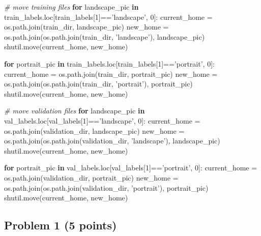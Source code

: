 \documentclass[11pt]{article}
\newenvironment{Shaded}{}{}
\newcommand{\KeywordTok}[1]{\textcolor[rgb]{0.00,0.44,0.13}{\textbf{{#1}}}}
\newcommand{\DecValTok}[1]{\textcolor[rgb]{0.25,0.63,0.44}{{#1}}}
\newcommand{\StringTok}[1]{\textcolor[rgb]{0.25,0.44,0.63}{{#1}}}
\newcommand{\CommentTok}[1]{\textcolor[rgb]{0.38,0.63,0.69}{\textit{{#1}}}}
\newcommand{\NormalTok}[1]{{#1}}
\newcommand{\ControlFlowTok}[1]{\textcolor[rgb]{0.00,0.44,0.13}{\textbf{{#1}}}}
\newcommand{\OperatorTok}[1]{\textcolor[rgb]{0.40,0.40,0.40}{{#1}}}
\begin{document}
    \begin{Shaded}
\begin{Highlighting}[]
\CommentTok{# move training files}
\ControlFlowTok{for}\NormalTok{ landscape_pic }\KeywordTok{in}\NormalTok{ train_labels.loc[train_labels[}\DecValTok{1}\NormalTok{]}\OperatorTok{==}\StringTok{'landscape'}\NormalTok{, }\DecValTok{0}\NormalTok{]:}
\NormalTok{    current_home }\OperatorTok{=}\NormalTok{ os.path.join(train_dir, landscape_pic)}
\NormalTok{    new_home }\OperatorTok{=}\NormalTok{ os.path.join(os.path.join(train_dir, }\StringTok{'landscape'}\NormalTok{), landscape_pic)}
\NormalTok{    shutil.move(current_home, new_home)}
    
\ControlFlowTok{for}\NormalTok{ portrait_pic }\KeywordTok{in}\NormalTok{ train_labels.loc[train_labels[}\DecValTok{1}\NormalTok{]}\OperatorTok{==}\StringTok{'portrait'}\NormalTok{, }\DecValTok{0}\NormalTok{]:}
\NormalTok{    current_home }\OperatorTok{=}\NormalTok{ os.path.join(train_dir, portrait_pic)}
\NormalTok{    new_home }\OperatorTok{=}\NormalTok{ os.path.join(os.path.join(train_dir, }\StringTok{'portrait'}\NormalTok{), portrait_pic)}
\NormalTok{    shutil.move(current_home, new_home)}
    
\CommentTok{# move validation files}
\ControlFlowTok{for}\NormalTok{ landscape_pic }\KeywordTok{in}\NormalTok{ val_labels.loc[val_labels[}\DecValTok{1}\NormalTok{]}\OperatorTok{==}\StringTok{'landscape'}\NormalTok{, }\DecValTok{0}\NormalTok{]:}
\NormalTok{    current_home }\OperatorTok{=}\NormalTok{ os.path.join(validation_dir, landscape_pic)}
\NormalTok{    new_home }\OperatorTok{=}\NormalTok{ os.path.join(os.path.join(validation_dir, }\StringTok{'landscape'}\NormalTok{), landscape_pic)}
\NormalTok{    shutil.move(current_home, new_home)}
    
\ControlFlowTok{for}\NormalTok{ portrait_pic }\KeywordTok{in}\NormalTok{ val_labels.loc[val_labels[}\DecValTok{1}\NormalTok{]}\OperatorTok{==}\StringTok{'portrait'}\NormalTok{, }\DecValTok{0}\NormalTok{]:}
\NormalTok{    current_home }\OperatorTok{=}\NormalTok{ os.path.join(validation_dir, portrait_pic)}
\NormalTok{    new_home }\OperatorTok{=}\NormalTok{ os.path.join(os.path.join(validation_dir, }\StringTok{'portrait'}\NormalTok{), portrait_pic)}
\NormalTok{    shutil.move(current_home, new_home)}
\end{Highlighting}
\end{Shaded}

    \subsection{Problem 1 (5 points)}\label{problem-1-5-points}
\end{document}
